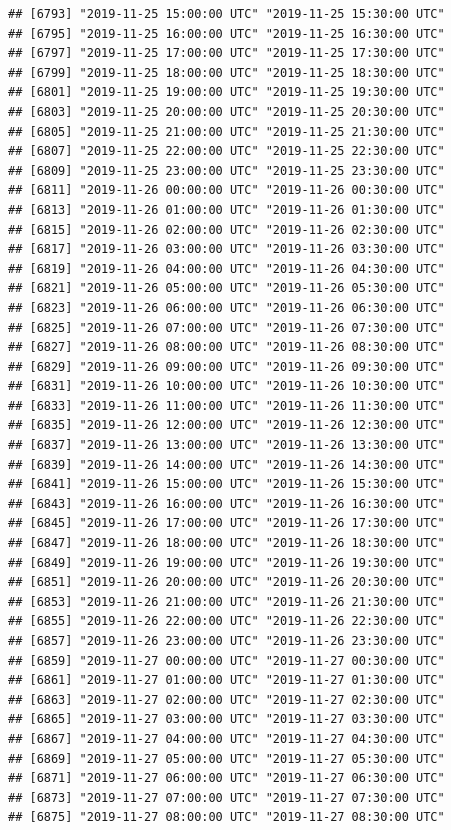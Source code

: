 \documentclass{article}\usepackage[]{graphicx}\usepackage[]{color}
\makeatletter
\newenvironment{kframe}{%
 \def\at@end@of@kframe{}%
 \ifinner\ifhmode%
  \def\at@end@of@kframe{\end{minipage}}%
  \begin{minipage}{\columnwidth}%
 \fi\fi%
 \def\FrameCommand##1{\hskip\@totalleftmargin \hskip-\fboxsep
 \colorbox{shadecolor}{##1}\hskip-\fboxsep
     \hskip-\linewidth \hskip-\@totalleftmargin \hskip\columnwidth}%
 \MakeFramed {\advance\hsize-\width
   \@totalleftmargin\z@ \linewidth\hsize
   \@setminipage}}%
 {\par\unskip\endMakeFramed%
 \at@end@of@kframe}
\newenvironment{knitrout}{}{} %
\makeatother
\begin{document}
\begin{knitrout}
\begin{kframe}
\begin{verbatim}
## [6793] "2019-11-25 15:00:00 UTC" "2019-11-25 15:30:00 UTC"
## [6795] "2019-11-25 16:00:00 UTC" "2019-11-25 16:30:00 UTC"
## [6797] "2019-11-25 17:00:00 UTC" "2019-11-25 17:30:00 UTC"
## [6799] "2019-11-25 18:00:00 UTC" "2019-11-25 18:30:00 UTC"
## [6801] "2019-11-25 19:00:00 UTC" "2019-11-25 19:30:00 UTC"
## [6803] "2019-11-25 20:00:00 UTC" "2019-11-25 20:30:00 UTC"
## [6805] "2019-11-25 21:00:00 UTC" "2019-11-25 21:30:00 UTC"
## [6807] "2019-11-25 22:00:00 UTC" "2019-11-25 22:30:00 UTC"
## [6809] "2019-11-25 23:00:00 UTC" "2019-11-25 23:30:00 UTC"
## [6811] "2019-11-26 00:00:00 UTC" "2019-11-26 00:30:00 UTC"
## [6813] "2019-11-26 01:00:00 UTC" "2019-11-26 01:30:00 UTC"
## [6815] "2019-11-26 02:00:00 UTC" "2019-11-26 02:30:00 UTC"
## [6817] "2019-11-26 03:00:00 UTC" "2019-11-26 03:30:00 UTC"
## [6819] "2019-11-26 04:00:00 UTC" "2019-11-26 04:30:00 UTC"
## [6821] "2019-11-26 05:00:00 UTC" "2019-11-26 05:30:00 UTC"
## [6823] "2019-11-26 06:00:00 UTC" "2019-11-26 06:30:00 UTC"
## [6825] "2019-11-26 07:00:00 UTC" "2019-11-26 07:30:00 UTC"
## [6827] "2019-11-26 08:00:00 UTC" "2019-11-26 08:30:00 UTC"
## [6829] "2019-11-26 09:00:00 UTC" "2019-11-26 09:30:00 UTC"
## [6831] "2019-11-26 10:00:00 UTC" "2019-11-26 10:30:00 UTC"
## [6833] "2019-11-26 11:00:00 UTC" "2019-11-26 11:30:00 UTC"
## [6835] "2019-11-26 12:00:00 UTC" "2019-11-26 12:30:00 UTC"
## [6837] "2019-11-26 13:00:00 UTC" "2019-11-26 13:30:00 UTC"
## [6839] "2019-11-26 14:00:00 UTC" "2019-11-26 14:30:00 UTC"
## [6841] "2019-11-26 15:00:00 UTC" "2019-11-26 15:30:00 UTC"
## [6843] "2019-11-26 16:00:00 UTC" "2019-11-26 16:30:00 UTC"
## [6845] "2019-11-26 17:00:00 UTC" "2019-11-26 17:30:00 UTC"
## [6847] "2019-11-26 18:00:00 UTC" "2019-11-26 18:30:00 UTC"
## [6849] "2019-11-26 19:00:00 UTC" "2019-11-26 19:30:00 UTC"
## [6851] "2019-11-26 20:00:00 UTC" "2019-11-26 20:30:00 UTC"
## [6853] "2019-11-26 21:00:00 UTC" "2019-11-26 21:30:00 UTC"
## [6855] "2019-11-26 22:00:00 UTC" "2019-11-26 22:30:00 UTC"
## [6857] "2019-11-26 23:00:00 UTC" "2019-11-26 23:30:00 UTC"
## [6859] "2019-11-27 00:00:00 UTC" "2019-11-27 00:30:00 UTC"
## [6861] "2019-11-27 01:00:00 UTC" "2019-11-27 01:30:00 UTC"
## [6863] "2019-11-27 02:00:00 UTC" "2019-11-27 02:30:00 UTC"
## [6865] "2019-11-27 03:00:00 UTC" "2019-11-27 03:30:00 UTC"
## [6867] "2019-11-27 04:00:00 UTC" "2019-11-27 04:30:00 UTC"
## [6869] "2019-11-27 05:00:00 UTC" "2019-11-27 05:30:00 UTC"
## [6871] "2019-11-27 06:00:00 UTC" "2019-11-27 06:30:00 UTC"
## [6873] "2019-11-27 07:00:00 UTC" "2019-11-27 07:30:00 UTC"
## [6875] "2019-11-27 08:00:00 UTC" "2019-11-27 08:30:00 UTC"

\end{verbatim}
\end{kframe}
\end{knitrout}
\end{document}
